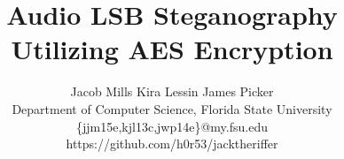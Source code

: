 \documentclass[sigchi, 11pt]{acmart}
\begin{document}
\title{\textbf{Audio LSB Steganography Utilizing AES Encryption}}
\author{
	Jacob Mills \qquad Kira Lessin \qquad James Picker \\
	Department of Computer Science, Florida State University \\
	\{jjm15e,kjl13c,jwp14e\}@my.fsu.edu \\
	https://github.com/h0r53/jacktheriffer
	\vspace{.25cm}
}

\maketitle





\end{document}
